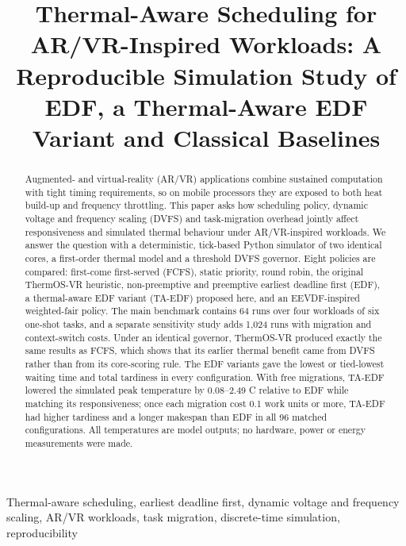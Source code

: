 \documentclass[conference]{IEEEtran}
\begin{document}
\title{Thermal-Aware Scheduling for AR/VR-Inspired Workloads: A Reproducible Simulation Study of EDF, a Thermal-Aware EDF Variant and Classical Baselines}

\author{
}

\maketitle

\begin{abstract}
Augmented- and virtual-reality (AR/VR) applications combine sustained computation with tight timing requirements, so on mobile processors they are exposed to both heat build-up and frequency throttling. This paper asks how scheduling policy, dynamic voltage and frequency scaling (DVFS) and task-migration overhead jointly affect responsiveness and simulated thermal behaviour under AR/VR-inspired workloads. We answer the question with a deterministic, tick-based Python simulator of two identical cores, a first-order thermal model and a threshold DVFS governor. Eight policies are compared: first-come first-served (FCFS), static priority, round robin, the original ThermOS-VR heuristic, non-preemptive and preemptive earliest deadline first (EDF), a thermal-aware EDF variant (TA-EDF) proposed here, and an EEVDF-inspired weighted-fair policy. The main benchmark contains 64 runs over four workloads of six one-shot tasks, and a separate sensitivity study adds 1,024 runs with migration and context-switch costs. Under an identical governor, ThermOS-VR produced exactly the same results as FCFS, which shows that its earlier thermal benefit came from DVFS rather than from its core-scoring rule. The EDF variants gave the lowest or tied-lowest waiting time and total tardiness in every configuration. With free migrations, TA-EDF lowered the simulated peak temperature by 0.08--2.49 \textdegree{}C relative to EDF while matching its responsiveness; once each migration cost 0.1 work units or more, TA-EDF had higher tardiness and a longer makespan than EDF in all 96 matched configurations. All temperatures are model outputs; no hardware, power or energy measurements were made.
\end{abstract}

\begin{IEEEkeywords}
Thermal-aware scheduling, earliest deadline first, dynamic voltage and frequency scaling, AR/VR workloads, task migration, discrete-time simulation, reproducibility
\end{IEEEkeywords}
\end{document}
